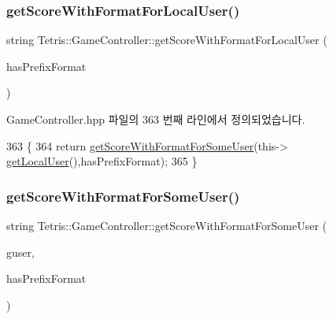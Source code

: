 \subsubsection{\texorpdfstring{get\+Score\+With\+Format\+For\+Local\+User()}{getScoreWithFormatForLocalUser()}}
{\footnotesize\ttfamily string Tetris\+::\+Game\+Controller\+::get\+Score\+With\+Format\+For\+Local\+User (\begin{DoxyParamCaption}\item[{bool}]{has\+Prefix\+Format }\end{DoxyParamCaption})\hspace{0.3cm}{\ttfamily [inline]}}



Game\+Controller.\+hpp 파일의 363 번째 라인에서 정의되었습니다.


\begin{DoxyCode}
363                                                                    \{
364             \textcolor{keywordflow}{return} \hyperlink{class_tetris_1_1_game_controller_ab9ee25a033698516dd98c254ab8f8f1b}{getScoreWithFormatForSomeUser}(this->
      \hyperlink{class_tetris_1_1_game_controller_abc67d4b309ce2886b43a3b4e0af22abc}{getLocalUser}(),hasPrefixFormat);
365         \}
\end{DoxyCode}
\mbox{\label{class_tetris_1_1_game_controller_ab9ee25a033698516dd98c254ab8f8f1b}} 
\subsubsection{\texorpdfstring{get\+Score\+With\+Format\+For\+Some\+User()}{getScoreWithFormatForSomeUser()}}
{\footnotesize\ttfamily string Tetris\+::\+Game\+Controller\+::get\+Score\+With\+Format\+For\+Some\+User (\begin{DoxyParamCaption}\item[{\hyperlink{class_tetris_1_1_users_1_1_game_user}{Game\+User} $\ast$}]{guser,  }\item[{bool}]{has\+Prefix\+Format }\end{DoxyParamCaption})\hspace{0.3cm}{\ttfamily [inline]}}



